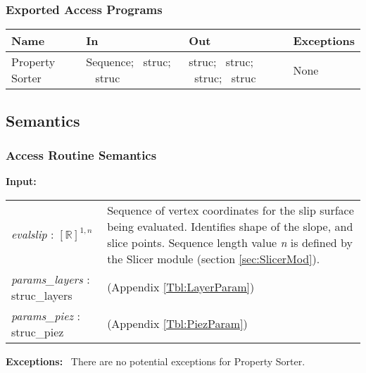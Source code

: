 \documentclass[12pt, titlepage]{article}
\begin{document}
\subsubsection{Exported Access Programs}
\begin{center}
\renewcommand*{\arraystretch}{1.5}
\begin{tabular}{| p{} | p{} | 
p{} | p{} |} \hline 

  \textbf{Name} & \textbf{In} & \textbf{Out} & \textbf{Exceptions}
  \\ \hline

  Property Sorter & Sequence; ~\newline struc; ~\newline
  struc & struc; ~\newline struc; ~\newline struc; ~\newline struc &
  None \\ \hline
\end{tabular}
\end{center}

\subsection{Semantics}

\subsubsection{Access Routine Semantics}
\textbf{Input:}
\renewcommand*{\arraystretch}{1.5}
\begin{longtable}{p{} p{}}
  \textit{evalslip} : $[\mathbb{R}]^{1,n}$ & Sequence of vertex
  coordinates for the slip surface being evaluated. Identifies shape
  of the slope, and slice points. Sequence length value \textit{n} is
  defined by the Slicer module (section \ref{sec:SlicerMod}).  \\

  \textit{params\_layers} : struc\_layers & (Appendix
  \ref{Tbl:LayerParam}) \\
  
  \textit{params\_piez} : struc\_piez & (Appendix \ref{Tbl:PiezParam})
  \\
\end{longtable}

\noindent \textbf{Exceptions:} ~\newline\noindent There are no
potential exceptions for Property Sorter.
\end{document}

